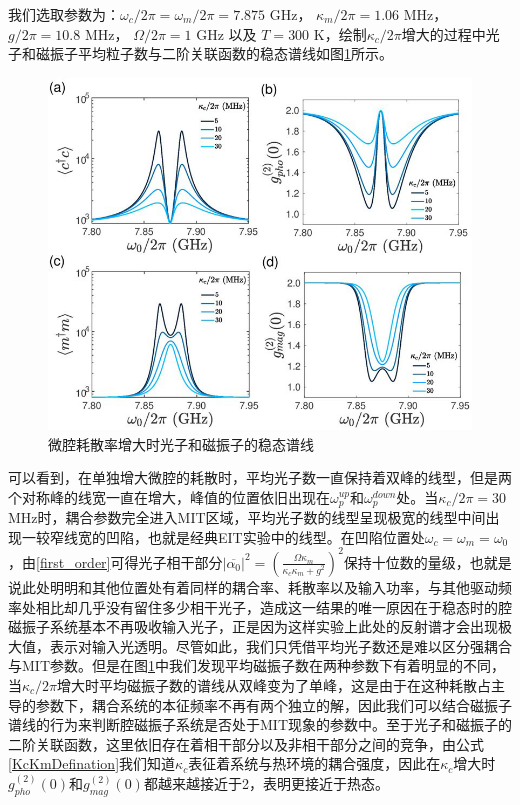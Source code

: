 我们选取参数为：$\omega_c/2\pi=\omega_m/2\pi=7.875$ GHz， $\kappa_m/2\pi=1.06$ MHz， $g/2\pi=10.8$ MHz， $\Omega/2\pi=1$ GHz 以及 $T=300$ K，绘制$\kappa_c/2\pi$增大的过程中光子和磁振子平均粒子数与二阶关联函数的稳态谱线如图\ref{MITkcVary}所示。
\begin{figure}[htbp]
	\centering
	\includegraphics[width=2\basefigurewidth,clip]{./figure/4_5}
	\caption{微腔耗散率增大时光子和磁振子的稳态谱线} 
	\label{MITkcVary}
\end{figure}
可以看到，在单独增大微腔的耗散时，平均光子数一直保持着双峰的线型，但是两个对称峰的线宽一直在增大，峰值的位置依旧出现在$\omega_p^{up}$和$\omega_p^{down}$处。当$\kappa_c/2\pi=30$MHz时，耦合参数完全进入MIT区域，平均光子数的线型呈现极宽的线型中间出现一较窄线宽的凹陷，也就是经典EIT实验中的线型。在凹陷位置处$\omega_c=\omega_m=\omega_0$，由\eqref{first_order}可得光子相干部分$|\overline{\alpha_{0}}|^2 = \left(\frac{\Omega\kappa_{m}}{\kappa_{c}\kappa_{m}+g^{2}}\right)^2$保持十位数的量级，也就是说此处明明和其他位置处有着同样的耦合率、耗散率以及输入功率，与其他驱动频率处相比却几乎没有留住多少相干光子，造成这一结果的唯一原因在于稳态时的腔磁振子系统基本不再吸收输入光子，正是因为这样实验上此处的反射谱才会出现极大值，表示对输入光透明。尽管如此，我们只凭借平均光子数还是难以区分强耦合与MIT参数。但是在图\ref{MITkcVary}中我们发现平均磁振子数在两种参数下有着明显的不同，当$\kappa_c/2\pi$增大时平均磁振子数的谱线从双峰变为了单峰，这是由于在这种耗散占主导的参数下，耦合系统的本征频率不再有两个独立的解，因此我们可以结合磁振子谱线的行为来判断腔磁振子系统是否处于MIT现象的参数中。至于光子和磁振子的二阶关联函数，这里依旧存在着相干部分以及非相干部分之间的竞争，由公式\eqref{KcKmDefination}我们知道$\kappa_c$表征着系统与热环境的耦合强度，因此在$\kappa_c$增大时$g_{pho}^{(2)}(0)$和$g_{mag}^{(2)}(0)$都越来越接近于2，表明更接近于热态。

